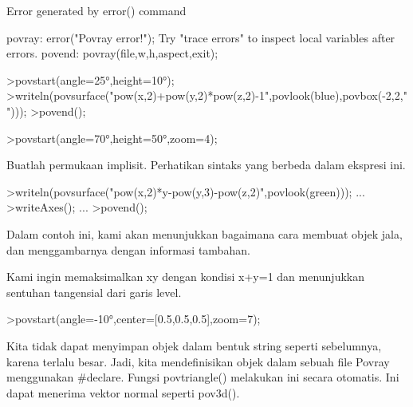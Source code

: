 \documentclass{article}
\begin{document}
\begin{eulernotebook}
\begin{euleroutput}
  Error generated by error() command
  
  povray:
      error("Povray error!");
  Try "trace errors" to inspect local variables after errors.
  povend:
      povray(file,w,h,aspect,exit); 
\end{euleroutput}
\begin{eulerprompt}
>povstart(angle=25°,height=10°); 
>writeln(povsurface("pow(x,2)+pow(y,2)*pow(z,2)-1",povlook(blue),povbox(-2,2,"")));
>povend();
\end{eulerprompt}
\begin{eulerprompt}
>povstart(angle=70°,height=50°,zoom=4);
\end{eulerprompt}
\begin{eulercomment}
Buatlah permukaan implisit. Perhatikan sintaks yang berbeda dalam
ekspresi ini.
\end{eulercomment}
\begin{eulerprompt}
>writeln(povsurface("pow(x,2)*y-pow(y,3)-pow(z,2)",povlook(green))); ...
>writeAxes(); ...
>povend();
\end{eulerprompt}
\begin{eulercomment}
Dalam contoh ini, kami akan menunjukkan bagaimana cara membuat objek
jala, dan menggambarnya dengan informasi tambahan.

Kami ingin memaksimalkan xy dengan kondisi x+y=1 dan menunjukkan
sentuhan tangensial dari garis level.
\end{eulercomment}
\begin{eulerprompt}
>povstart(angle=-10°,center=[0.5,0.5,0.5],zoom=7);
\end{eulerprompt}
\begin{eulercomment}
Kita tidak dapat menyimpan objek dalam bentuk string seperti
sebelumnya, karena terlalu besar. Jadi, kita mendefinisikan objek
dalam sebuah file Povray menggunakan #declare. Fungsi povtriangle()
melakukan ini secara otomatis. Ini dapat menerima vektor normal
seperti pov3d().


\end{eulercomment}
\end{eulernotebook}
\end{document}
